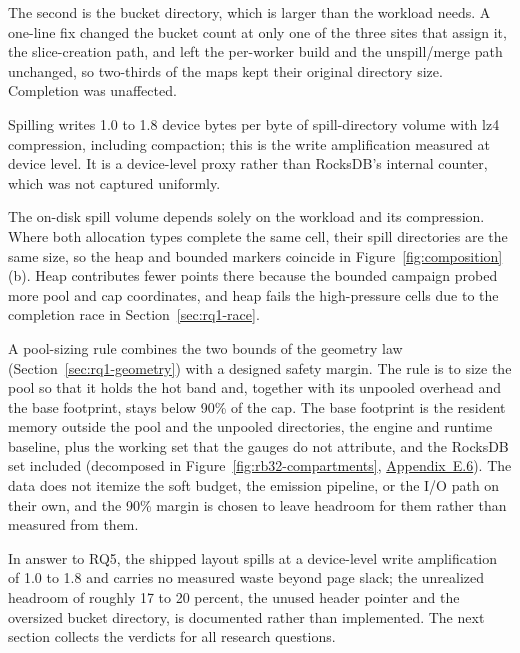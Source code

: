 The second is the bucket directory, which is larger than the workload needs.
A one-line fix changed the bucket count at only one of the three sites that assign it, the slice-creation path, and left the per-worker build and the unspill/merge path unchanged, so two-thirds of the maps kept their original directory size.
Completion was unaffected.

Spilling writes 1.0 to 1.8 device bytes per byte of spill-directory volume with lz4 compression, including compaction; this is the write amplification measured at device level.
It is a device-level proxy rather than RocksDB's internal counter, which was not captured uniformly.

The on-disk spill volume depends solely on the workload and its compression.
Where both allocation types complete the same cell, their spill directories are the same size, so the heap and bounded markers coincide in Figure~\ref{fig:composition}(b).
Heap contributes fewer points there because the bounded campaign probed more pool and cap coordinates, and heap fails the high-pressure cells due to the completion race in Section~\ref{sec:rq1-race}.

A pool-sizing rule combines the two bounds of the geometry law (Section~\ref{sec:rq1-geometry}) with a designed safety margin.
The rule is to size the pool so that it holds the hot band and, together with its unpooled overhead and the base footprint, stays below 90\% of the cap.
The base footprint is the resident memory outside the pool and the unpooled directories, the engine and runtime baseline, plus the working set that the gauges do not attribute, and the RocksDB set included (decomposed in Figure~\ref{fig:rb32-compartments}, \hyperref[app:rb32]{Appendix~E.6}).
The data does not itemize the soft budget, the emission pipeline, or the I/O path on their own, and the 90\% margin is chosen to leave headroom for them rather than measured from them.

In answer to RQ5, the shipped layout spills at a device-level write amplification of 1.0 to 1.8 and carries no measured waste beyond page slack; the unrealized headroom of roughly 17 to 20 percent, the unused header pointer and the oversized bucket directory, is documented rather than implemented.
The next section collects the verdicts for all research questions.

